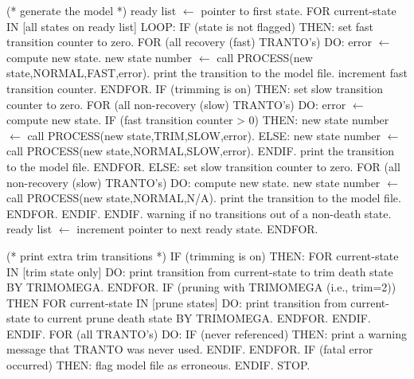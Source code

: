 \begin{logfileexample}
    (* generate the model *)
    ready list \(\longleftarrow\) pointer to first state.
    FOR current-state IN [all states on ready list] LOOP:
        IF (state is not flagged) THEN:
           set fast transition counter to zero.
           FOR (all recovery (fast) TRANTO's) DO:
               error \(\longleftarrow\) compute new state.
               new state number \(\longleftarrow\) call PROCESS(new state,NORMAL,FAST,error).
               print the transition to the model file.
               increment fast transition counter.
           ENDFOR.
           IF (trimming is on) THEN:
               set slow transition counter to zero.
               FOR (all non-recovery (slow) TRANTO's) DO:
                   error \(\longleftarrow\) compute new state.
                   IF (fast transition counter > 0) THEN:
                      new state number \(\longleftarrow\) call PROCESS(new state,TRIM,SLOW,error).
                   ELSE:
                      new state number \(\longleftarrow\) call PROCESS(new state,NORMAL,SLOW,error).
                   ENDIF.
                   print the transition to the model file.
               ENDFOR.
           ELSE:
               set slow transition counter to zero.
               FOR (all non-recovery (slow) TRANTO's) DO:
                   compute new state.
                   new state number \(\longleftarrow\) call PROCESS(new state,NORMAL,N/A).
                   print the transition to the model file.
               ENDFOR.
           ENDIF.
        ENDIF.
        warning if no transitions out of a non-death state.
        ready list \(\longleftarrow\) increment pointer to next ready state.
    ENDFOR.

    (* print extra trim transitions *)
    IF (trimming is on) THEN:
       FOR current-state IN [trim state only] DO:
           print transition from current-state to trim death
                 state BY TRIMOMEGA.
       ENDFOR.
       IF  (pruning with TRIMOMEGA (i.e., trim=2)) THEN
           FOR current-state IN [prune states] DO:
               print transition from current-state to current prune
                     death state BY TRIMOMEGA.
           ENDFOR.
       ENDIF.
    ENDIF.
    FOR (all TRANTO's) DO:
       IF (never referenced) THEN:
           print a warning message that TRANTO was never used.
       ENDIF.
    ENDFOR.
    IF (fatal error occurred) THEN:
       flag model file as erroneous.
    ENDIF.
STOP.
\end{logfileexample}




